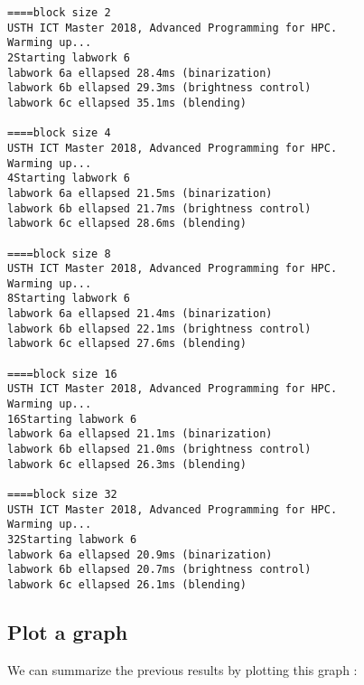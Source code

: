 \documentclass{article}
\begin{document}
    \begin{verbatim}
====block size 2
USTH ICT Master 2018, Advanced Programming for HPC.
Warming up...
2Starting labwork 6
labwork 6a ellapsed 28.4ms (binarization)
labwork 6b ellapsed 29.3ms (brightness control)
labwork 6c ellapsed 35.1ms (blending)

====block size 4
USTH ICT Master 2018, Advanced Programming for HPC.
Warming up...
4Starting labwork 6
labwork 6a ellapsed 21.5ms (binarization)
labwork 6b ellapsed 21.7ms (brightness control)
labwork 6c ellapsed 28.6ms (blending)

====block size 8
USTH ICT Master 2018, Advanced Programming for HPC.
Warming up...
8Starting labwork 6
labwork 6a ellapsed 21.4ms (binarization)
labwork 6b ellapsed 22.1ms (brightness control)
labwork 6c ellapsed 27.6ms (blending)

====block size 16
USTH ICT Master 2018, Advanced Programming for HPC.
Warming up...
16Starting labwork 6
labwork 6a ellapsed 21.1ms (binarization)
labwork 6b ellapsed 21.0ms (brightness control)
labwork 6c ellapsed 26.3ms (blending)

====block size 32
USTH ICT Master 2018, Advanced Programming for HPC.
Warming up...
32Starting labwork 6
labwork 6a ellapsed 20.9ms (binarization)
labwork 6b ellapsed 20.7ms (brightness control)
labwork 6c ellapsed 26.1ms (blending)

    \end{verbatim}

\subsection{Plot a graph}
    We can summarize the previous results by plotting this graph :
    
    \newline
\end{document}
